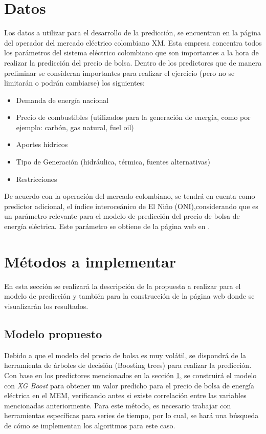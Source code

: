 \documentclass[conference, 10pt]{IEEEtran}
\begin{document}
\section{Datos} \label{sec:data}
Los datos a utilizar para el desarrollo de la predicción, se encuentran en la página del operador del mercado eléctrico colombiano XM. Esta empresa concentra todos los parámetros del sistema eléctrico colombiano que son importantes a la hora de realizar la predicción del precio de bolsa. Dentro de los predictores que de manera preliminar se consideran importantes para realizar el ejercicio (pero no se limitarán o podrán cambiarse) los siguientes:
\begin{itemize}
\item Demanda de energía nacional 
\item Precio de combustibles (utilizados para la generación de energía, como por ejemplo: carbón, gas natural, fuel oil)
\item Aportes hídricos 
\item Tipo de Generación (hidráulica, térmica, fuentes alternativas) 
\item Restricciones
\end{itemize}
De acuerdo con la operación del mercado colombiano, se tendrá en cuenta como predictor adicional, el índice interoceánico de El Niño (ONI),considerando que es un parámetro relevante para el modelo de predicción del precio de bolsa de energía eléctrica. Este parámetro se obtiene de la página web en \cite{b3}. 

\section{Métodos a implementar} \label{sec:meth}
En esta sección se realizará la descripción de la propuesta a realizar para el modelo de predicción y también para la construcción de la página web donde se visualizarán los resultados.
\subsection{Modelo propuesto} \label{sec:prop}
Debido a que el modelo del precio de bolsa es muy volátil, se dispondrá de la herramienta de árboles de decisión (Boosting trees) para realizar la predicción. Con base en los predictores mencionados en la sección \ref{sec:data}, se construirá el modelo con \textit{XG Boost} para obtener un valor predicho para el precio de bolsa de energía eléctrica en el MEM, verificando antes si existe correlación entre las variables mencionadas anteriormente. Para este método, es necesario trabajar con herramientas específicas para series de tiempo, por lo cual, se hará una búsqueda de cómo se implementan los algoritmos para este caso. \
\end{document}
